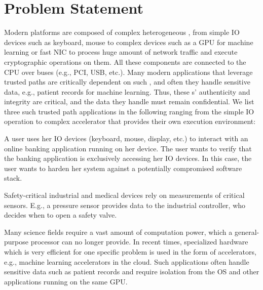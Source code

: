 \section{Problem Statement}
\label{pie:sec:problemStatement}

Modern platforms are composed of complex heterogeneous \sphw, from simple IO devices such as keyboard, mouse to complex devices such as a GPU for machine learning or fast NIC to process huge amount of network traffic and execute cryptographic operations on them. All these components are connected to the CPU over buses (e.g., PCI, USB, etc.). Many modern applications that leverage trusted paths are critically dependent on such \sphw, and often they handle sensitive data, e.g., patient records for machine learning. Thus, these \sphw{}s' authenticity and integrity are critical, and the data they handle must remain confidential. We list three such trusted path applications in the following ranging from the simple IO operation to complex accelerator that provides their own execution environment:


 A user uses her IO devices (keyboard, mouse, display, etc.) to interact with an online banking application running on her device. The user wants to verify that the banking application is exclusively accessing her IO devices. In this case, the user wants to harden her system against a potentially compromised software stack.

Safety-critical industrial and medical devices rely on measurements of critical sensors. E.g., a pressure sensor provides data to the industrial controller, who decides when to open a safety valve.


Many science fields require a vast amount of computation power, which a general-purpose processor can no longer provide. In recent times, specialized hardware which is very efficient for one specific problem is used in the form of accelerators, e.g., machine learning accelerators in the cloud. Such applications often handle sensitive data such as patient records and require isolation from the OS and other applications running on the same GPU. 

